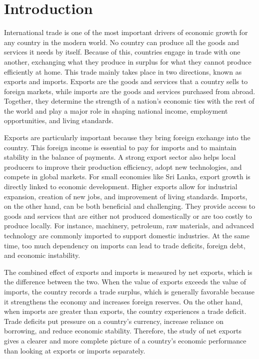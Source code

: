 \documentclass[12pt,a4paper]{report} %
\begin{document}
	
	
	\clearpage
	\setcounter{page}{1}    %
	

	\chapter{Introduction}
	
	International trade is one of the most important drivers of economic growth for any country in the modern world. No country can produce all the goods and services it needs by itself. Because of this, countries engage in trade with one another, exchanging what they produce in surplus for what they cannot produce efficiently at home. This trade mainly takes place in two directions, known as exports and imports. Exports are the goods and services that a country sells to foreign markets, while imports are the goods and services purchased from abroad. Together, they determine the strength of a nation’s economic ties with the rest of the world and play a major role in shaping national income, employment opportunities, and living standards.
	
	Exports are particularly important because they bring foreign exchange into the country. This foreign income is essential to pay for imports and to maintain stability in the balance of payments. A strong export sector also helps local producers to improve their production efficiency, adopt new technologies, and compete in global markets. For small economies like Sri Lanka, export growth is directly linked to economic development. Higher exports allow for industrial expansion, creation of new jobs, and improvement of living standards. Imports, on the other hand, can be both beneficial and challenging. They provide access to goods and services that are either not produced domestically or are too costly to produce locally. For instance, machinery, petroleum, raw materials, and advanced technology are commonly imported to support domestic industries. At the same time, too much dependency on imports can lead to trade deficits, foreign debt, and economic instability.
	
	The combined effect of exports and imports is measured by net exports, which is the difference between the two. When the value of exports exceeds the value of imports, the country records a trade surplus, which is generally favorable because it strengthens the economy and increases foreign reserves. On the other hand, when imports are greater than exports, the country experiences a trade deficit. Trade deficits put pressure on a country’s currency, increase reliance on borrowing, and reduce economic stability. Therefore, the study of net exports gives a clearer and more complete picture of a country’s economic performance than looking at exports or imports separately.
	
\end{document}
